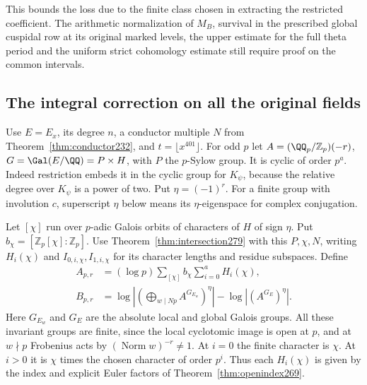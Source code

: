 \documentclass[a4paper,11pt]{article}
\theoremstyle{definition}
\theoremstyle{remark}
\newcommand{\ZZ}{\mathbb Z}\newcommand{\ord}{\operatorname{ord}}
\numberwithin{equation}{section}
\begin{document}
This bounds the loss due to the finite class chosen in extracting
the restricted coefficient. The arithmetic normalization of
\(M_B\), survival in the prescribed global cuspidal row at its
original marked levels, the upper estimate for the full theta
period and the uniform strict cohomology estimate still require
proof on the common intervals.

\subsection{The integral correction on all the original fields}\label{nav:II-59}
Use \(E=E_x\), its degree \(n\), a conductor multiple \(N\)
from Theorem~\ref{thm:conductor232}, and \(t=\lfloor x^{401}\rfloor\).
For odd \(p\) let \(A=(\QQ_p/\ZZ_p)(-r)\),
\(G=\Gal(E/\QQ)=P\times H\), with \(P\) the \(p\)-Sylow group.
It is cyclic of order \(p^a\). Indeed restriction embeds it in
the cyclic group for \(K_\psi\), because the relative degree
over \(K_\psi\) is a power of two. Put \(\eta=(-1)^r\).
For a finite group with involution \(c\), superscript \(\eta\)
below means its \(\eta\)-eigenspace for complex conjugation.

Let \([\chi]\) run over \(p\)-adic Galois orbits of characters
of \(H\) of sign \(\eta\). Put \(b_\chi=[\ZZ_p[\chi]:\ZZ_p]\).
Use Theorem~\ref{thm:intersection279} with this \(P,\chi,N\),
writing \(H_i(\chi)\) and \(I_{0,i,\chi},I_{1,i,\chi}\) for
its character lengths and residue subspaces. Define
\[
 \begin{split}
 A_{p,r}&=(\log p)\sum_{[\chi]} b_\chi\sum_{i=0}^a H_i(\chi),\\
 B_{p,r}&=\log\left|\left(\bigoplus_{w\mid Np}A^{G_{E_w}}\right)^\eta\right|
                  -\log\left|(A^{G_E})^\eta\right|.
 \end{split}
\]
Here \(G_{E_w}\) and \(G_E\) are the absolute local and global
Galois groups. All these invariant groups are finite, since the
local cyclotomic image is open at \(p\), and at \(w\nmid p\)
Frobenius acts by \((\operatorname{Norm}w)^{-r}\ne1\).
At \(i=0\) the finite character is \(\chi\). At \(i>0\) it is
\(\chi\) times the chosen character of order \(p^i\).
Thus each \(H_i(\chi)\) is given by the index and explicit
Euler factors of Theorem~\ref{thm:openindex269}.
\end{document}
